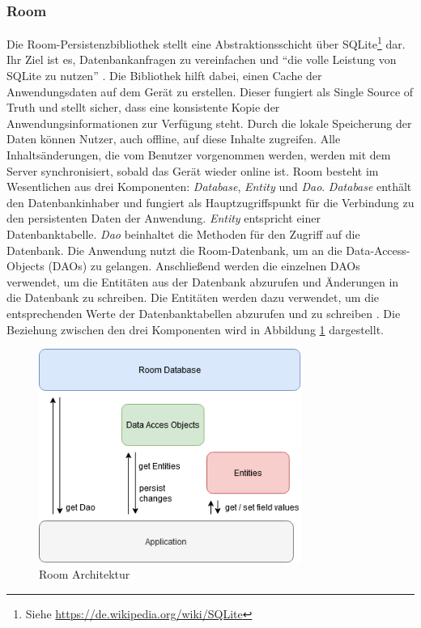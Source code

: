 \documentclass[a4paper]{article}
\begin{document}
\subsubsection{Room}
\label{subsubsec:technologies:bibs:room}
Die Room-Persistenzbibliothek stellt eine Abstraktionsschicht über SQLite\footnote{Siehe \url{https://de.wikipedia.org/wiki/SQLite}} dar. Ihr Ziel ist es, Datenbankanfragen zu vereinfachen und "`die volle Leistung von SQLite zu nutzen"' \autocite{android_room_architecture}. Die Bibliothek hilft dabei, einen Cache der Anwendungsdaten auf dem Gerät zu erstellen. Dieser fungiert als Single Source of Truth und stellt sicher, dass eine konsistente Kopie der Anwendungsinformationen zur Verfügung steht. Durch die lokale Speicherung der Daten können Nutzer, auch offline, auf diese Inhalte zugreifen. Alle Inhaltsänderungen, die vom Benutzer vorgenommen werden, werden mit dem Server synchronisiert, sobald das Gerät wieder online ist.\newline
Room besteht im Wesentlichen aus drei Komponenten: \textit{Database}, \textit{Entity} und \textit{Dao}. \textit{Database} enthält den Datenbankinhaber und fungiert als Hauptzugriffspunkt für die Verbindung zu den persistenten Daten der Anwendung. \textit{Entity} entspricht einer Datenbanktabelle. \textit{Dao} beinhaltet die Methoden für den Zugriff auf die Datenbank. Die Anwendung nutzt die Room-Datenbank, um an die Data-Access-Objects (DAOs) zu gelangen. Anschließend werden die einzelnen DAOs verwendet, um die Entitäten aus der Datenbank abzurufen und Änderungen in die Datenbank zu schreiben. Die Entitäten werden dazu verwendet, um die entsprechenden Werte der Datenbanktabellen abzurufen und zu schreiben \autocite{android_room_data_storage}. Die Beziehung zwischen den drei Komponenten wird in Abbildung \ref{fig:room} dargestellt.

\begin{figure}[H]
	\centering
	\includegraphics[height=7cm,keepaspectratio]{./images/Room.png}
	\caption{Room Architektur}
	\label{fig:room}
\end{figure}
\end{document}
